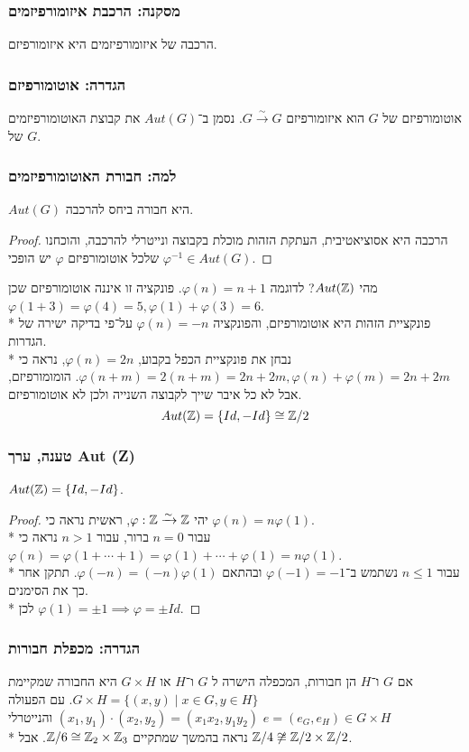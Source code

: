 \subsubsection{מסקנה: הרכבת איזומורפיזמים}
הרכבה של איזומורפיזמים היא איזומורפיזם.

\subsubsection{הגדרה: אוטומורפיזם}
אוטומורפיזם של $G$ הוא איזומורפיזם $G \xrightarrow{\sim} G$. נסמן ב־$Aut(G)$ את קבוצת האוטומורפיזמים של $G$.

\subsubsection{למה: חבורת האוטומורפיזמים}
$Aut(G)$ היא חבורה ביחס להרכבה.
\begin{proof}
	הרכבה היא אסוציאטיבית, העתקת הזהות מוכלת בקבוצה ונייטרלי להרכבה, והוכחנו שלכל אוטומורפיזם $\varphi$ יש הופכי $\varphi^{-1} \in Aut(G)$.
\end{proof}
מהי $Aut(\mathbb{Z})$? לדוגמה $\varphi(n) = n + 1$. פונקציה זו איננה אוטומורפיזם שכן $\varphi(1 + 3) = \varphi(4) = 5, \varphi(1) + \varphi(3) = 6$. \\*
פונקציית הזהות היא אוטומורפיזם, והפונקציה $\varphi(n) = -n$ על־פי בדיקה ישירה של הגדרות. \\*
נבחן את פונקציית הכפל בקבוע, $\varphi(n) = 2n$, נראה כי $\varphi(n + m) = 2(n + m) = 2n + 2m, \varphi(n) + \varphi(m) = 2n + 2m$. הומומורפיזם, אבל לא כל איבר שייך לקבוצה השנייה ולכן לא אוטומורפיזם.
\[
	Aut(\mathbb{Z}) = \{Id, -Id\} \cong \mathbb{Z}/2
\]

\subsubsection{טענה, ערך Aut (Z)}
$Aut(\mathbb{Z}) = \{Id, -Id\}$.
\begin{proof}
	יהי $\varphi : \mathbb{Z} \xrightarrow{\sim} \mathbb{Z}$, ראשית נראה כי $\varphi(n) = n\varphi(1)$. \\*
	עבור $n = 0$ ברור, עבור $ n > 1$ נראה כי $\varphi(n) = \varphi(1 + \cdots + 1) = \varphi(1) + \cdots + \varphi(1) = n \varphi(1)$. \\*
	עבור $n \le 1$ נשתמש ב־$\varphi(-1) = -1$ ובהתאם $\varphi(-n) = (-n)\varphi(1)$. תתקן אחר כך את הסימנים. \\*
	לכן $\varphi(1) = \pm 1 \implies \varphi = \pm Id$.
\end{proof}

\subsubsection{הגדרה: מכפלת חבורות}
אם $G$ ו־$H$ הן חבורות, המכפלה הישרה ל $G$ ו־$H$ או $G \times H$ היא החבורה שמקיימת $G \times H = \{ (x, y) \mid x \in G, y \in H \}$.
עם הפעולה $(x_1, y_1) \cdot (x_2, y_2) = (x_1 x_2, y_1 y_2)$ והנייטרלי $e = (e_G, e_H) \in G \times H$ \\*
נראה בהמשך שמתקיים $\mathbb{Z}/6 \cong \mathbb{Z}_2 \times \mathbb{Z}_3$. אבל $\mathbb{Z}/4 \not\cong \mathbb{Z}/2 \times \mathbb{Z}/2$.

